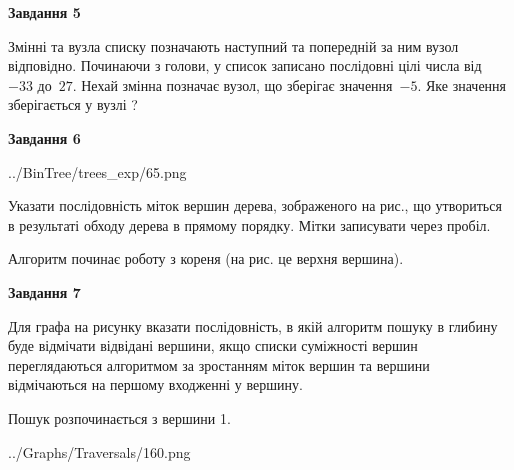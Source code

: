 \documentclass[12pt, ukrainian]{article}
\begin{document}
{\begin {large}
{\begin {center}\textbf{Завдання 5}\end {center}}\par
Змінні  та  вузла списку позначають наступний та попередній за ним вузол відповідно. Починаючи з голови, у список записано послідовні цілі числа від~$-33$ до~$27$. Нехай змінна  позначає вузол, що зберігає значення~$-5$.
Яке значення зберігається у вузлі  ?\par
\newpage

{\begin {center}\textbf{Завдання 6}\end {center}}\par

\begin{center}
	{../BinTree/trees_exp/65.png}
\end{center}
Указати послідовність міток вершин дерева, зображеного на рис., що утвориться в результаті обходу дерева в прямому порядку. Мітки записувати через пробіл.\par Алгоритм починає роботу з кореня (на рис. це верхня вершина).\par
\newpage

{\begin {center}\textbf{Завдання 7}\end {center}}\par
Для графа на рисунку вказати послідовність, в якій алгоритм пошуку в глибину буде відмічати відвідані вершини, якщо списки суміжності вершин переглядаються алгоритмом за зростанням міток вершин та вершини відмічаються на першому вход\-женні у вершину.\par
Пошук розпочинається з вершини 1.\par

\begin{center}
	{../Graphs/Traversals/160.png}
\end{center}\par
\newpage


\end{large}}
\end{document}
